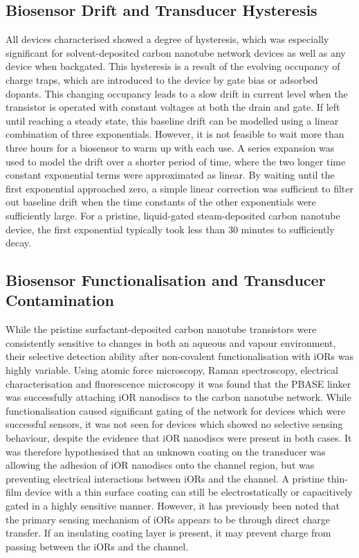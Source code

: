 \documentclass[
  a4paper,
]{scrbook}
\begin{document}
\hypertarget{biosensor-drift-and-transducer-hysteresis}{%
\subsection{Biosensor Drift and Transducer
Hysteresis}\label{biosensor-drift-and-transducer-hysteresis}}

All devices characterised showed a degree of hysteresis, which was
especially significant for solvent-deposited carbon nanotube network
devices as well as any device when backgated. This hysteresis is a
result of the evolving occupancy of charge traps, which are introduced
to the device by gate bias or adsorbed dopants. This changing occupancy
leads to a slow drift in current level when the transistor is operated
with constant voltages at both the drain and gate. If left until
reaching a steady state, this baseline drift can be modelled using a
linear combination of three exponentials. However, it is not feasible to
wait more than three hours for a biosensor to warm up with each use. A
series expansion was used to model the drift over a shorter period of
time, where the two longer time constant exponential terms were
approximated as linear. By waiting until the first exponential
approached zero, a simple linear correction was sufficient to filter out
baseline drift when the time constants of the other exponentials were
sufficiently large. For a pristine, liquid-gated steam-deposited carbon
nanotube device, the first exponential typically took less than 30
minutes to sufficiently decay.

\hypertarget{biosensor-functionalisation-and-transducer-contamination}{%
\subsection{Biosensor Functionalisation and Transducer
Contamination}\label{biosensor-functionalisation-and-transducer-contamination}}

While the pristine surfactant-deposited carbon nanotube transistors were
consistently sensitive to changes in both an aqueous and vapour
environment, their selective detection ability after non-covalent
functionalisation with iORs was highly variable. Using atomic force
microscopy, Raman spectroscopy, electrical characterisation and
fluorescence microscopy it was found that the PBASE linker was
successfully attaching iOR nanodiscs to the carbon nanotube network.
While functionalisation caused significant gating of the network for
devices which were successful sensors, it was not seen for devices which
showed no selective sensing behaviour, despite the evidence that iOR
nanodiscs were present in both cases. It was therefore hypothesised that
an unknown coating on the transducer was allowing the adhesion of iOR
nanodiscs onto the channel region, but was preventing electrical
interactions between iORs and the channel. A pristine thin-film device
with a thin surface coating can still be electrostatically or
capacitively gated in a highly sensitive manner. However, it has
previously been noted that the primary sensing mechanism of iORs appears
to be through direct charge transfer. If an insulating coating layer is
present, it may prevent charge from passing between the iORs and the
channel.
\end{document}
